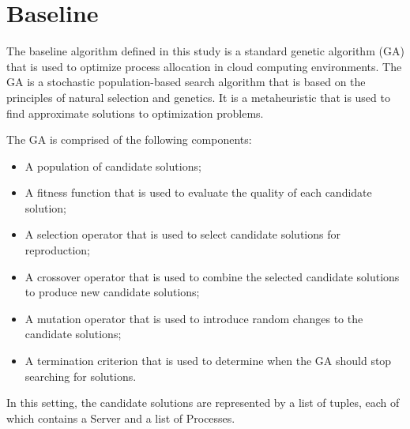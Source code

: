 \section{Baseline}\label{sect:baseline}

The baseline algorithm defined in this study is a standard genetic algorithm (GA) that is used to optimize 
process allocation in cloud computing environments.
The GA is a stochastic population-based search algorithm that is based on the principles of natural selection and genetics.
It is a metaheuristic that is used to find approximate solutions to optimization problems.

The GA is comprised of the following components:
\begin{itemize}
    \item A population of candidate solutions;
    \item A fitness function that is used to evaluate the quality of each candidate solution;
    \item A selection operator that is used to select candidate solutions for reproduction;
    \item A crossover operator that is used to combine the selected candidate solutions to produce new candidate solutions;
    \item A mutation operator that is used to introduce random changes to the candidate solutions;
    \item A termination criterion that is used to determine when the GA should stop searching for solutions.
\end{itemize}

In this setting, the candidate solutions are represented by a list of tuples, each of which contains a Server and a list of Processes.

